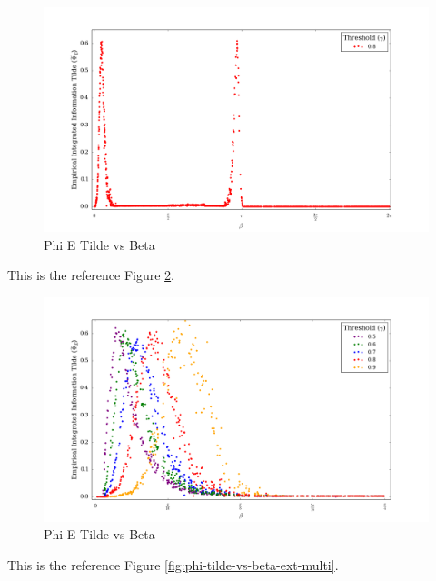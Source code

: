 \documentclass[a4paper,11pt]{article}
\begin{document}
\begin{figure}[H]
\begin{center}
\includegraphics[scale = 0.35]{figures/phi_tilde_vs_beta_ext}
\caption{
	Phi E Tilde vs Beta
	\label{fig:phi-tilde-vs-beta-ext}
}
\end{center}
\end{figure}

This is the reference Figure \ref{fig:phi-tilde-vs-beta-orig-multi}.

\begin{figure}[H]
\begin{center}
\includegraphics[scale = 0.35]{figures/phi_tilde_vs_beta_orig_multi}
\caption{
	Phi E Tilde vs Beta
	\label{fig:phi-tilde-vs-beta-orig-multi}
}
\end{center}
\end{figure}

This is the reference Figure \ref{fig:phi-tilde-vs-beta-ext-multi}.
\end{document}

